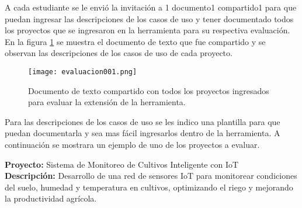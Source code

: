 A cada estudiante se le envió la invitación a 1 documento1 compartido1 para que puedan ingresar las descripciones de los casos de uso y tener documentado todos los proyectos que se ingresaron en la herramienta para su respectiva evaluación. En la figura \ref{fig:cap3_evaluacion_001} se muestra el documento de texto que fue compartido y se observan las descripciones de los casos de uso de cada proyecto.

 \begin{figure}[H]  
	\centering
	\texttt{[image: evaluacion001.png]} 
	\caption{Documento de texto compartido con todos los proyectos ingresados para evaluar la extensión de la herramienta.}
	\label{fig:cap3_evaluacion_001}
\end{figure}

Para las descripciones de los casos de uso se les indico una plantilla para que puedan documentarla y sea mas fácil ingresarlos dentro de la herramienta. A continuación se mostrara un ejemplo de uno de los proyectos a evaluar.

\textbf{Proyecto: } Sistema de Monitoreo de Cultivos Inteligente con IoT \\
\textbf{Descripción: } Desarrollo de una red de sensores IoT para monitorear condiciones del suelo, humedad y temperatura en cultivos, optimizando el riego y mejorando la productividad agrícola. 

